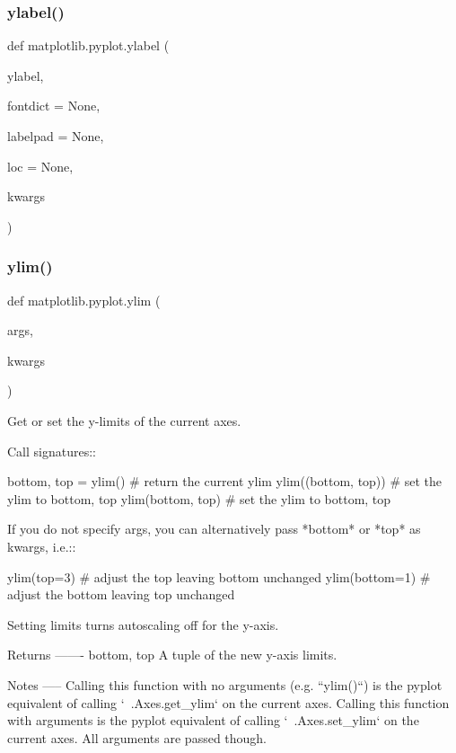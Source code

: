\subsubsection{\texorpdfstring{ylabel()}{ylabel()}}
{\footnotesize\ttfamily def matplotlib.\+pyplot.\+ylabel (\begin{DoxyParamCaption}\item[{}]{ylabel,  }\item[{}]{fontdict = {\ttfamily None},  }\item[{}]{labelpad = {\ttfamily None},  }\item[{}]{loc = {\ttfamily None},  }\item[{}]{kwargs }\end{DoxyParamCaption})}

\mbox{\label{namespacematplotlib_1_1pyplot_a9e2fdf635177a5c6158d666c7a5b77b4}} 
\subsubsection{\texorpdfstring{ylim()}{ylim()}}
{\footnotesize\ttfamily def matplotlib.\+pyplot.\+ylim (\begin{DoxyParamCaption}\item[{}]{args,  }\item[{}]{kwargs }\end{DoxyParamCaption})}

\begin{DoxyVerb}Get or set the y-limits of the current axes.

Call signatures::

    bottom, top = ylim()  # return the current ylim
    ylim((bottom, top))   # set the ylim to bottom, top
    ylim(bottom, top)     # set the ylim to bottom, top

If you do not specify args, you can alternatively pass *bottom* or
*top* as kwargs, i.e.::

    ylim(top=3)  # adjust the top leaving bottom unchanged
    ylim(bottom=1)  # adjust the bottom leaving top unchanged

Setting limits turns autoscaling off for the y-axis.

Returns
-------
bottom, top
    A tuple of the new y-axis limits.

Notes
-----
Calling this function with no arguments (e.g. ``ylim()``) is the pyplot
equivalent of calling `~.Axes.get_ylim` on the current axes.
Calling this function with arguments is the pyplot equivalent of calling
`~.Axes.set_ylim` on the current axes. All arguments are passed though.
\end{DoxyVerb}
 \mbox{\label{namespacematplotlib_1_1pyplot_a26a4b4e682d9f4e53bd5f011336312a6}} 

